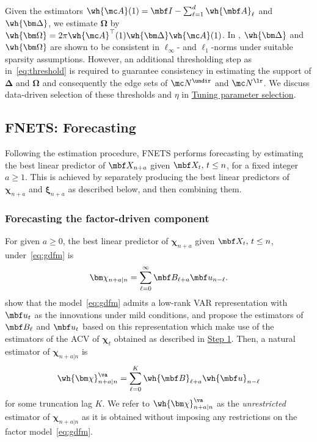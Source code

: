 Given the estimators $\wh{\mc A}(1) = \mbf I - \sum_{\ell = 1}^d \wh{\mbf A}_\ell$ and $\wh{\bm\Delta}$, we estimate $\bm\Omega$ by $\wh{\bm\Omega} = 2\pi \wh{\mc A}^\top(1) \wh{\bm\Delta} \wh{\mc A}(1)$.
In \cite{barigozzi2022fnets}, $\wh{\bm\Delta}$ and $\wh{\bm\Omega}$ are shown to be consistent in $\ell_\infty$- and $\ell_1$-norms under suitable sparsity assumptions.
However, an additional thresholding step as in~\eqref{eq:threshold} is required to guarantee consistency in estimating the support of $\bm\Delta$ and $\bm\Omega$ and consequently the edge sets of $\mc N^{\undir}$ and $\mc N^{\lr}$.
We discuss data-driven selection of these thresholds and $\eta$ in \hyperref[sec:tuning]{Tuning parameter selection}.

\subsection{FNETS: Forecasting}

Following the estimation procedure, FNETS performs forecasting by estimating the best linear predictor of $\mbf X_{n + a}$ given $\mbf X_t, \, t \le n$, for a fixed integer $a \ge 1$.
This is achieved by separately producing the best linear predictors of $\bm\chi_{n + a}$ and $\bm\xi_{n + a}$ as described below, and then combining them.

\subsubsection{Forecasting the factor-driven component}
\label{sec:common:pred}

For given $a \ge 0$, the best linear predictor of $\bm\chi_{n + a}$ given $\mbf X_t, \, t \le n$, under~\eqref{eq:gdfm} is 
\begin{align*}
\bm\chi_{n + a \vert n} = \sum_{\ell = 0}^\infty \mbf B_{\ell + a} \mbf u_{n  - \ell}.
\end{align*}
\cite{forni2015dynamic} show that the model~\eqref{eq:gdfm} admits a low-rank VAR representation with $\mbf u_t$ as the innovations under mild conditions, and \cite{forni2017dynamic} propose the estimators of $\mbf B_\ell$ and $\mbf u_t$ based on this representation which make use of the estimators of the ACV of $\bm\chi_t$ obtained as described in \hyperref[sec:step:one]{Step 1}.
Then, a natural estimator of $\bm\chi_{n + a \vert n}$ is
\begin{align}
\label{eq:chi:va}
\wh{\bm\chi}^{\va}_{n + a \vert n} = \sum_{\ell = 0}^K \wh{\mbf B}_{\ell + a} \wh{\mbf u}_{n  - \ell}
\end{align}
for some truncation lag $K$.
We refer to $\wh{\bm\chi}^{\va}_{n + a \vert n}$ as the {\it unrestricted} estimator of $\bm\chi_{n + a \vert n}$ as it is obtained without imposing any restrictions on the factor model~\eqref{eq:gdfm}.

